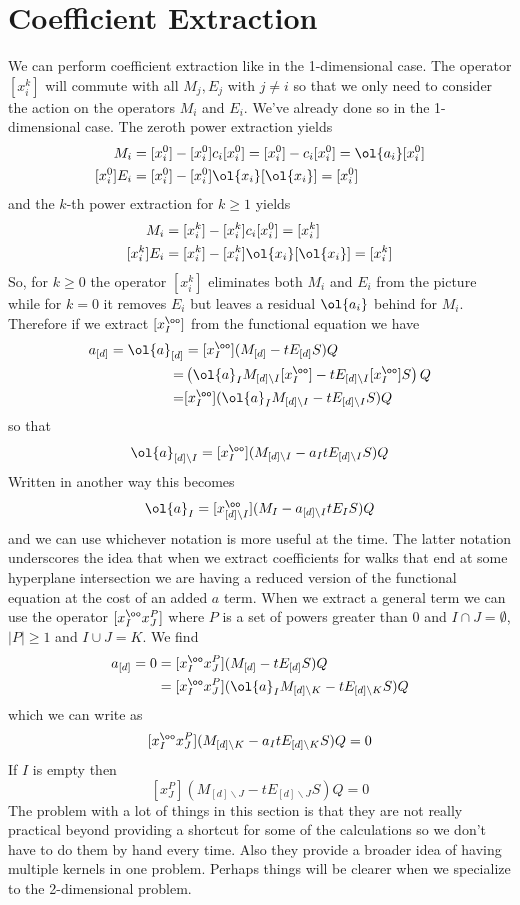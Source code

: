 \section{Coefficient Extraction}
We can perform coefficient extraction like in the 1-dimensional case. The operator $[x_i^k]$ will commute with all $M_j, E_j$ with $j\neq i$ so that we only need to consider the action on the operators $M_i$ and $E_i$. We've already done so in the 1-dimensional case. The zeroth power extraction yields
\begin{align*}
	[x_i^0]M_i &= [x_i^0]-[x_i^0]c_i[x_i^0] = [x_i^0]-c_i[x_i^0] = \ol{a_i}[x_i^0]\\
	[x_i^0]E_i &= [x_i^0] - [x_i^0]\ol{x_i}[\ol{x_i}] = [x_i^0]
\end{align*}
and the $k$-th power extraction for $k\ge 1$ yields
\begin{align*}
	[x_i^k]M_i &= [x_i^k]-[x_i^k]c_i[x_i^0] = [x_i^k]\\
	[x_i^k]E_i &= [x_i^k] - [x_i^k]\ol{x_i}[\ol{x_i}] = [x_i^k]
\end{align*}
So, for $k\ge 0$ the operator $[x_i^k]$ eliminates both $M_i$ and $E_i$ from the picture while for $k = 0$ it removes $E_i$ but leaves a residual $\ol{a_i}$ behind for $M_i$. Therefore if we extract $[x_I^\oo]$ from the functional equation we have
\begin{align*}
	[x_I^\oo]a_{[d]} =\ol{a}_{[d]} &= [x_I^\oo](M_{[d]} - tE_{[d]}S)Q \\
	= &\left(\ol{a}_{I}M_{[d]\backslash I}[x_I^\oo] - tE_{[d]\backslash I}[x_I^\oo]S\right)Q\\
	= &[x_I^\oo](\ol{a}_{I}M_{[d]\backslash I}- tE_{[d]\backslash I}S)Q
\end{align*}
so that
\[
	\ol{a}_{[d]\backslash I} = [x_I^\oo](M_{[d]\backslash I}- a_{I}tE_{[d]\backslash I}S)Q
\]
Written in another way this becomes
\[
	\ol{a}_I = [x_{[d]\backslash I}^\oo](M_I - a_{[d]\backslash I} tE_I S)Q
\]
and we can use whichever notation is more useful at the time. The latter notation underscores the idea that when we extract coefficients for walks that end at some hyperplane intersection we are having a reduced version of the functional equation at the cost of an added $a$ term. When we extract a general term we can use the operator $[x_I^\oo x_J^P]$ where $P$ is a set of powers greater than 0 and $I\cap J = \emptyset$, $|P| \ge 1$ and $I\cup J = K$. We find
\begin{align*}
	 [x_I^\oo x_J^P] a_{[d]} = 0 &= [x_I^\oo x_J^P](M_{[d]} - tE_{[d]}S)Q \\
	 &= [x_I^\oo x_J^P](\ol{a}_{I} M_{[d]\backslash K} - t E_{[d]\backslash K} S)Q
\end{align*}
which we can write as
\[
	[x_I^\oo x_J^P]( M_{[d]\backslash K} - a_I t E_{[d]\backslash K} S)Q = 0
\]
If $I$ is empty then
\[
	[x_J^P]( M_{[d]\backslash J} - t E_{[d]\backslash J} S)Q = 0
\]
The problem with a lot of things in this section is that they are not really practical beyond providing a shortcut for some of the calculations so we don't have to do them by hand every time. Also they provide a broader idea of having multiple kernels in one problem. Perhaps things will be clearer when we specialize to the 2-dimensional problem.

